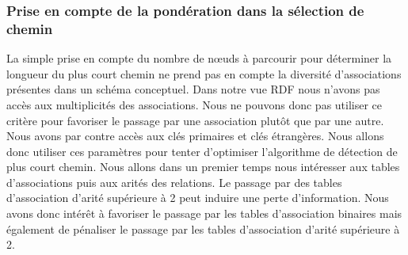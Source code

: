 \subsubsection*{Prise en compte de la pondération dans la sélection de chemin}
La simple prise en compte du nombre de nœuds à parcourir pour déterminer la longueur du plus court chemin ne prend pas en compte la diversité d'associations présentes dans un schéma conceptuel. Dans notre vue RDF nous n'avons pas accès aux multiplicités des associations. Nous ne pouvons donc pas utiliser ce critère pour favoriser le passage par une association plutôt que par une autre. Nous avons par contre accès aux clés primaires et clés étrangères. Nous allons donc utiliser ces paramètres pour tenter d'optimiser l'algorithme de détection de plus court chemin. Nous allons dans un premier temps nous intéresser aux tables d'associations puis aux arités des relations. Le passage par des tables d'association d'arité supérieure à 2 peut induire une perte d'information. Nous avons donc intérêt à favoriser le passage par les tables d'association binaires mais également de pénaliser le passage par les tables d'association d'arité supérieure à 2.





